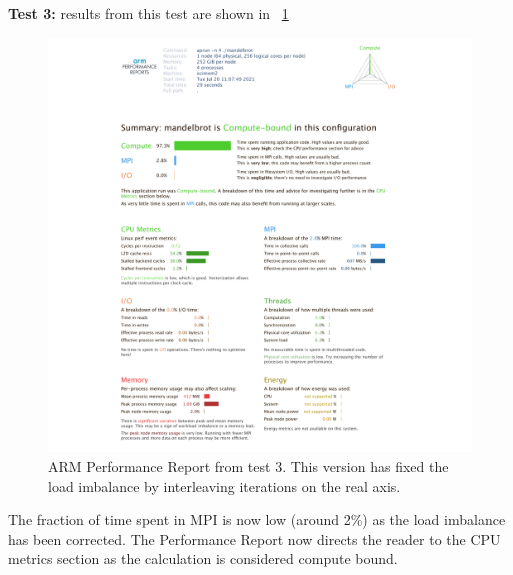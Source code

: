 \documentclass[a4paper,titlepage]{article}
\begin{document}
\noindent
\textbf{Test 3:} results from this test are shown in ~\ref{fig:perf-report_test3}
\begin{figure}[htbp]
\begin{center}
\includegraphics[scale=0.35]{figures/mandelbrot_v2_PerformanceReport}
\caption{ARM Performance Report from test 3. This version has fixed the load imbalance by interleaving iterations on the real axis.}
\label{fig:perf-report_test3}
\end{center}
\end{figure}
The fraction of time spent in MPI is now low (around 2\%) as the load imbalance has been corrected. The Performance Report now directs the reader to the CPU metrics section 
as the calculation is considered compute bound. \\
\end{document}
